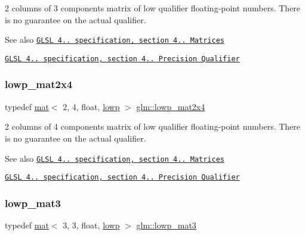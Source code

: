 2 columns of 3 components matrix of low qualifier floating-\/point numbers. There is no guarantee on the actual qualifier.

\begin{DoxySeeAlso}{See also}
\href{http://www.opengl.org/registry/doc/GLSLangSpec.4.20.8.pdf}{\tt G\+L\+SL 4.. specification, section 4.. Matrices} 

\href{http://www.opengl.org/registry/doc/GLSLangSpec.4.20.8.pdf}{\tt G\+L\+SL 4.. specification, section 4.. Precision Qualifier} 
\end{DoxySeeAlso}
\mbox{\label{group__core__precision_ga674d889016f44d1084ec467c73df8434}} 
\subsubsection{\texorpdfstring{lowp\+\_\+mat2x4}{lowp\_mat2x4}}
{\footnotesize\ttfamily typedef \mbox{\hyperlink{structglm_1_1mat}{mat}}$<$ 2, 4, float, \mbox{\hyperlink{namespaceglm_a36ed105b07c7746804d7fdc7cc90ff25ae161af3fc695e696ce3bf69f7332bc2d}{lowp}} $>$ \mbox{\hyperlink{group__core__precision_ga674d889016f44d1084ec467c73df8434}{glm\+::lowp\+\_\+mat2x4}}}

2 columns of 4 components matrix of low qualifier floating-\/point numbers. There is no guarantee on the actual qualifier.

\begin{DoxySeeAlso}{See also}
\href{http://www.opengl.org/registry/doc/GLSLangSpec.4.20.8.pdf}{\tt G\+L\+SL 4.. specification, section 4.. Matrices} 

\href{http://www.opengl.org/registry/doc/GLSLangSpec.4.20.8.pdf}{\tt G\+L\+SL 4.. specification, section 4.. Precision Qualifier} 
\end{DoxySeeAlso}
\mbox{\label{group__core__precision_ga8845e8da3db051cd798abc644850c6c2}} 
\subsubsection{\texorpdfstring{lowp\+\_\+mat3}{lowp\_mat3}}
{\footnotesize\ttfamily typedef \mbox{\hyperlink{structglm_1_1mat}{mat}}$<$ 3, 3, float, \mbox{\hyperlink{namespaceglm_a36ed105b07c7746804d7fdc7cc90ff25ae161af3fc695e696ce3bf69f7332bc2d}{lowp}} $>$ \mbox{\hyperlink{group__core__precision_ga8845e8da3db051cd798abc644850c6c2}{glm\+::lowp\+\_\+mat3}}}

